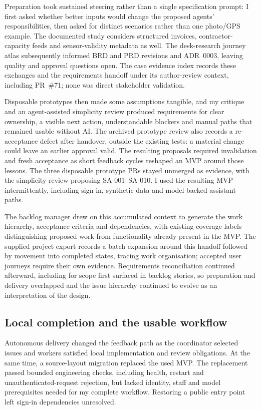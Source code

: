 \documentclass[11pt,a4paper]{article}
\begin{document}
Preparation took sustained steering rather than a single specification prompt: I first asked whether better inputs would change the proposed
agents' responsibilities, then asked for distinct scenarios rather than
one photo/GPS example. The documented study considers structured invoices,
contractor-capacity feeds and sensor-validity metadata as well.
The desk-research journey atlas subsequently informed BRD and PRD revisions
and ADR~0003, leaving quality and approval questions open.
The case evidence index records these exchanges and the requirements
handoff under its author-review context, including PR~\#71;
none was direct stakeholder validation.

Disposable prototypes then made some assumptions tangible, and my critique
and an agent-assisted simplicity review produced requirements for
clear ownership, a visible next action, understandable blockers and manual
paths that remained usable without AI\@. The archived prototype review
also records a re-acceptance defect after handover, outside the existing
tests: a material change could leave an earlier approval valid. The resulting proposals required invalidation and fresh acceptance as short feedback cycles reshaped an
MVP around those lessons. The three disposable prototype PRs stayed unmerged as evidence, with the simplicity review proposing SA-001--SA-010.
I used the resulting MVP intermittently, including sign-in, synthetic
data and model-backed assistant paths.

The backlog manager drew on this accumulated context to generate the work hierarchy, acceptance criteria and dependencies, with existing-coverage labels distinguishing proposed work from functionality already present in the MVP\@.
The supplied project export records a batch expansion around this handoff followed by movement into completed states, tracing work organisation; accepted user journeys require their own evidence.
Requirements reconciliation continued afterward, including for scope first surfaced in backlog stories, so preparation and delivery overlapped and the issue hierarchy continued to evolve as an interpretation of the design.

\subsection{Local completion and the usable workflow}

Autonomous delivery changed the feedback path as the coordinator selected issues and workers satisfied local implementation and review obligations.
At the same time, a source-layout migration replaced the used MVP\@. The
replacement passed bounded engineering checks, including health, restart
and unauthenticated-request rejection, but lacked identity, staff and model
prerequisites needed for my complete workflow. Restoring a
public entry point left sign-in dependencies unresolved.
\end{document}

